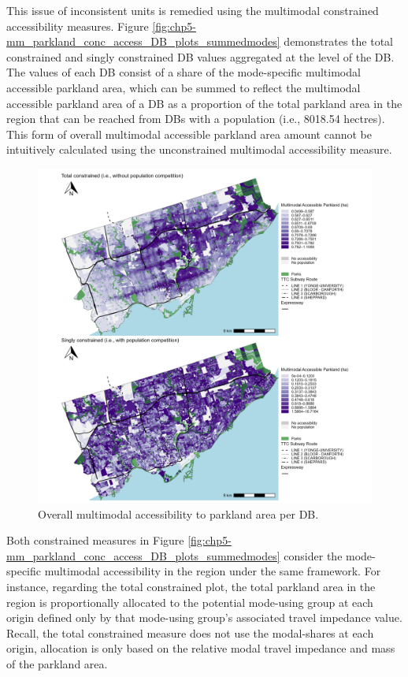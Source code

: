 \documentclass[
11pt, %
oneside, %
english, %
singlespacing, %
]{macthesis} %
\begin{document}
This issue of inconsistent units is remedied using the multimodal constrained accessibility measures. Figure \ref{fig:chp5-mm_parkland_conc_access_DB_plots_summedmodes} demonstrates the total constrained and singly constrained DB values aggregated at the level of the DB. The values of each DB consist of a share of the mode-specific multimodal accessible parkland area, which can be summed to reflect the multimodal accessible parkland area of a DB as a proportion of the total parkland area in the region that can be reached from DBs with a population (i.e., 8018.54 hectres). This form of overall multimodal accessible parkland area amount cannot be intuitively calculated using the unconstrained multimodal accessibility measure.

\begin{figure}

{\centering \includegraphics[width=6in]{./data/figures/chp5-mm_parkland_conc_access_DB_plots_summedmodes} 

}

\caption{\label{fig:chp5-mm_parkland_conc_access_DB_plots_summedmodes}Overall multimodal accessibility to parkland area per DB.}\label{fig:unnamed-chunk-75}
\end{figure}

Both constrained measures in Figure \ref{fig:chp5-mm_parkland_conc_access_DB_plots_summedmodes} consider the mode-specific multimodal accessibility in the region under the same framework. For instance, regarding the total constrained plot, the total parkland area in the region is proportionally allocated to the potential mode-using group at each origin defined only by that mode-using group's associated travel impedance value. Recall, the total constrained measure does not use the modal-shares at each origin, allocation is only based on the relative modal travel impedance and mass of the parkland area.
\end{document}
